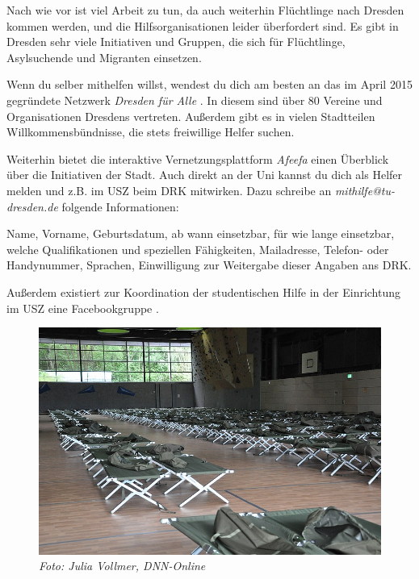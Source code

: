 Nach wie vor ist viel Arbeit zu tun, da auch weiterhin Flüchtlinge nach Dresden kommen werden, und die Hilfsorganisationen leider überfordert sind. Es gibt in Dresden sehr viele Initiativen und Gruppen, die sich für Flüchtlinge, Asylsuchende und Migranten einsetzen. 

Wenn du selber mithelfen willst, wendest du dich am besten an das im April 2015 gegründete Netzwerk \textit{Dresden für Alle} . In diesem sind über 80 Vereine und Organisationen Dresdens vertreten. Außerdem gibt es in vielen Stadtteilen Willkommensbündnisse, die stets freiwillige Helfer suchen.

Weiterhin bietet die interaktive Vernetzungsplattform \textit{Afeefa}  einen Überblick über die Initiativen der Stadt. Auch direkt an der Uni kannst du dich als Helfer melden und z.B. im USZ beim DRK mitwirken. Dazu schreibe an \textit{mithilfe@tu-dresden.de} folgende Informationen:

Name, Vorname, Geburtsdatum, ab wann einsetzbar, für wie lange einsetzbar, welche Qualifikationen und speziellen Fähigkeiten, Mailadresse, Telefon- oder Handynummer, Sprachen, Einwilligung zur Weitergabe dieser Angaben ans DRK.

Außerdem existiert zur Koordination der studentischen Hilfe in der Einrichtung im USZ eine Facebookgruppe .

\vfill

\begin{figure}[h!]
\centering
\includegraphics[width=.8\linewidth]{img/usz_feldbetten.jpg}
\caption*{\small \textit{Foto: Julia Vollmer, DNN-Online}}
\end{figure}